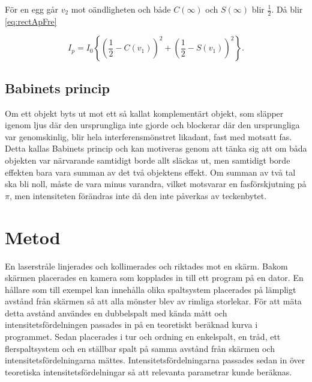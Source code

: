 \documentclass[a4paper]{article}
\begin{document}
För en egg går $v_2$ mot oändligheten och både $C(\infty)$ och $S(\infty)$ blir $\frac{1}{2}$. Då blir \eqref{eq:rectApFre}

\begin{equation}
	I_p = I_0 \left\{\left(\frac{1}{2} - C(v_1)\right)^2 + \left(\frac{1}{2} - S(v_1)\right)^2\right\}\text{.}
	\label{eq:diffEdge}
\end{equation}

\FloatBarrier

\subsection{Babinets princip}

Om ett objekt byts ut mot ett så kallat komplementärt objekt, som släpper igenom ljus där den ursprungliga inte gjorde och blockerar där den ursprungliga var genomskinlig, blir hela interferensmönstret likadant, fast med motsatt fas. Detta kallas Babinets princip och kan motiveras genom att tänka sig att om båda objekten var närvarande samtidigt borde allt släckas ut, men samtidigt borde effekten bara vara summan av det två objektens effekt. Om summan av två tal ska bli noll, måste de vara minus varandra, vilket motsvarar en fasförskjutning på $\pi$, men intensiteten förändras inte då den inte påverkas av teckenbytet.

\section{Metod}
  
  En laserstråle linjerades och kollimerades och riktades mot en skärm. Bakom skärmen placerades en kamera som kopplades in till ett program på en dator. En hållare som till exempel kan innehålla olika spaltsystem placerades på lämpligt avstånd från skärmen så att alla mönster blev av rimliga storlekar.
  För att mäta detta avstånd användes en dubbelspalt med kända mått och intensitetsfördelningen passades in på en teoretiskt beräknad kurva i programmet. Sedan placerades i tur och ordning en enkelspalt, en tråd, ett flerspaltsystem och en ställbar spalt på samma avstånd från skärmen och intensitetsfördelningarna mättes. Intensitetsfördelningarna passades sedan in över teoretiska intensitetsfördelningar så att relevanta parametrar kunde beräknas.
  
\end{document}

